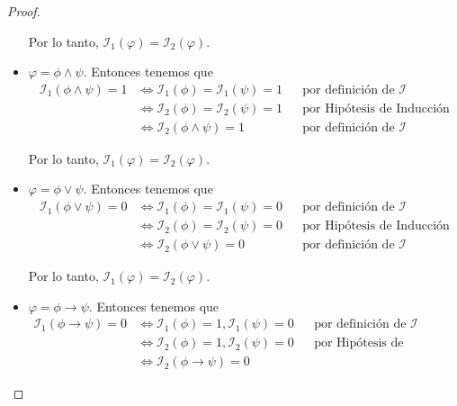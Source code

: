 \documentclass[letterpaper,12pt]{article}
\begin{document}
\begin{proof}
\begin{itemize}
            Por lo tanto, 
            $\mathcal{I}_{1}(\varphi) = \mathcal{I}_{2}(\varphi)$.

            \item $\varphi = \phi \land \psi$. Entonces tenemos que
            \begin{align*}
                \mathcal{I}_{1}(\phi \land \psi) = 1
                &\Leftrightarrow \mathcal{I}_{1}(\phi) = \mathcal{I}_{1}(\psi)
                = 1
                && \text{por definición de $\mathcal{I}$} \\
                &\Leftrightarrow \mathcal{I}_{2}(\phi) = \mathcal{I}_{2}(\psi)
                = 1
                && \text{por Hipótesis de Inducción} \\
                &\Leftrightarrow \mathcal{I}_{2}(\phi \land \psi) = 1
                && \text{por definición de $\mathcal{I}$}
            \end{align*}

            Por lo tanto, 
            $\mathcal{I}_{1}(\varphi) = \mathcal{I}_{2}(\varphi)$.

            \item $\varphi = \phi \lor \psi$. Entonces tenemos que 
            \begin{align*}
                \mathcal{I}_{1}(\phi \lor \psi) = 0
                &\Leftrightarrow \mathcal{I}_{1}(\phi) = \mathcal{I}_{1}(\psi)
                = 0
                && \text{por definición de $\mathcal{I}$} \\
                &\Leftrightarrow \mathcal{I}_{2}(\phi) = \mathcal{I}_{2}(\psi)
                = 0
                && \text{por Hipótesis de Inducción} \\
                &\Leftrightarrow \mathcal{I}_{2}(\phi \lor \psi) = 0
                && \text{por definición de $\mathcal{I}$} 
            \end{align*}

            Por lo tanto, 
            $\mathcal{I}_{1}(\varphi) = \mathcal{I}_{2}(\varphi)$.

            \item $\varphi = \phi \rightarrow \psi$. Entonces tenemos que 
            \begin{align*}
                \mathcal{I}_{1}(\phi \rightarrow \psi) = 0
                &\Leftrightarrow \mathcal{I}_{1}(\phi) = 1,
                \mathcal{I}_{1}(\psi) = 0
                && \text{por definición de $\mathcal{I}$} \\
                &\Leftrightarrow \mathcal{I}_{2}(\phi) = 1, 
                \mathcal{I}_{2}(\psi) = 0
                && \text{por Hipótesis de Inducción} \\
                &\Leftrightarrow \mathcal{I}_{2}(\phi \rightarrow \psi) = 0
            \end{align*}


\end{itemize}
\end{proof}
\end{document}

